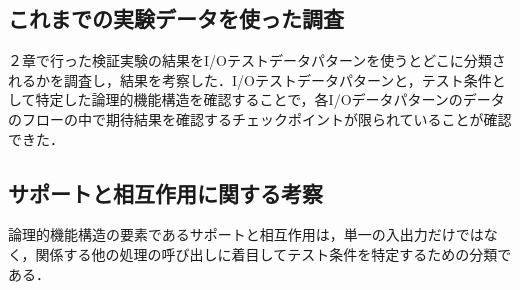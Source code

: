 \documentclass[a4paper,12pt]{jreport}
\begin{document}


\subsection{これまでの実験データを使った調査}
２章で行った検証実験の結果をI/Oテストデータパターンを使うとどこに分類されるかを調査し，結果を考察した．I/Oテストデータパターンと，テスト条件として特定した論理的機能構造を確認することで，各I/Oデータパターンのデータのフローの中で期待結果を確認するチェックポイントが限られていることが確認できた．

\subsection{サポートと相互作用に関する考察}
論理的機能構造の要素であるサポートと相互作用は，単一の入出力だけではなく，関係する他の処理の呼び出しに着目してテスト条件を特定するための分類である．
\end{document}
